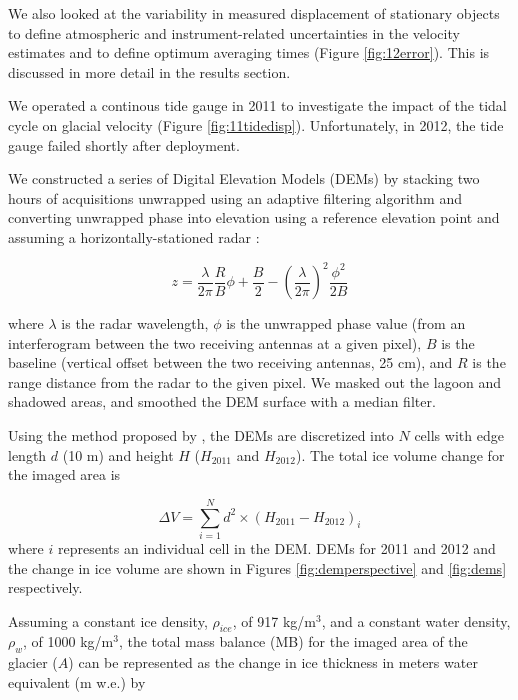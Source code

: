 We also looked at the variability in measured displacement of stationary objects to define atmospheric and instrument-related uncertainties in the velocity estimates and to define optimum averaging times (Figure \ref{fig:12error}). This is discussed in more detail in the results section.


We operated a continous tide gauge in 2011 to investigate the impact of the tidal cycle on glacial velocity (Figure \ref{fig:11tidedisp}). Unfortunately, in 2012, the tide gauge failed shortly after deployment. 


We constructed a series of Digital Elevation Models (DEMs) by stacking two hours of acquisitions unwrapped using an adaptive filtering algorithm \citep{goldstein1998radar} and converting unwrapped phase into elevation using a reference elevation point and assuming a horizontally-stationed radar \citep{strozzi2012topography}:
  
\begin{equation}z=\frac{\lambda}{2\pi}\frac{R}{B}\phi+\frac{B}{2}-\left(\frac{\lambda}{2\pi}\right)^2 \frac{\phi^2}{2B}\end{equation}
 
where $\lambda$ is the radar wavelength, $\phi$ is the unwrapped phase value (from an interferogram between the two receiving antennas at a given pixel), $B$ is the baseline (vertical offset between the two receiving antennas, 25 cm), and $R$ is the range distance from the radar to the given pixel. We masked out the lagoon and shadowed areas, and smoothed the DEM surface with a median filter. 


Using the method proposed by \citet{etzelmuller1993mass}, the DEMs are discretized into $N$ cells with edge length $d$ (10 m) and height $H$ ($H_{2011}$ and $H_{2012}$). The total ice volume change for the imaged area is
  
\begin{equation}\Delta V=\sum\limits_{i=1}^N d^2 \times (H_{2011}-H_{2012})_i\end{equation} where $i$ represents an individual cell in the DEM. DEMs for 2011 and 2012 and the change in ice volume are shown in Figures \ref{fig:demperspective} and \ref{fig:dems} respectively.
 
Assuming a constant ice density, $\rho_{ice}$, of 917 kg/m$^3$, and a constant water density, $\rho_{w}$, of 1000 kg/m$^3$, the total mass balance (MB) for the imaged area of the glacier ($A$) can be represented as the change in ice thickness in meters water equivalent (m w.e.) by
  
